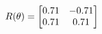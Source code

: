 \documentclass[preview]{standalone}
\begin{document}
\begin{align*}
\special{dvisvgm:raw <g id='unique000'>}R(\theta) = \begin{bmatrix}0.71 & -0.71\\0.71 & 0.71\end{bmatrix}\special{dvisvgm:raw </g>}
\end{align*}
\end{document}
